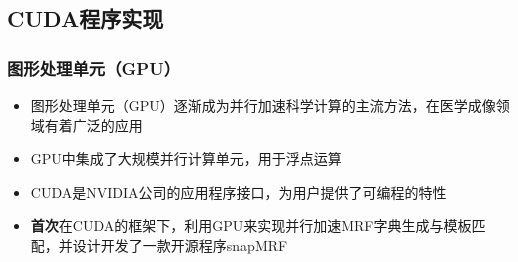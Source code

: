 \documentclass{beamer}
\begin{document}
\subsection{CUDA程序实现}
\begin{frame}
	\frametitle{图形处理单元（GPU）}
	\begin{itemize}
		\item 图形处理单元（GPU）逐渐成为并行加速科学计算的主流方法，在医学成像领域有着广泛的应用	
		\item GPU中集成了大规模并行计算单元，用于浮点运算
		\item CUDA是NVIDIA公司的应用程序接口，为用户提供了可编程的特性
		\item \textbf{首次}在CUDA的框架下，利用GPU来实现并行加速MRF字典生成与模板匹配，并设计开发了一款开源程序snapMRF
	\end{itemize}

\end{frame}
\end{document}
